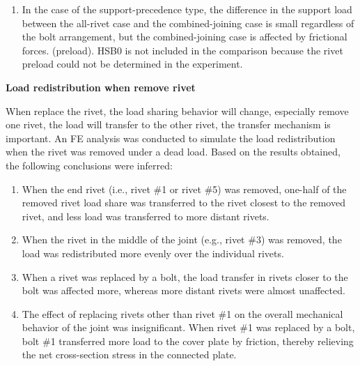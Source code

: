 \begin{enumerate}
    \item In the case of the support-precedence type, the difference in the support load between the all-rivet case and the combined-joining case is small regardless of the bolt arrangement, but the combined-joining case is affected by frictional forces. (preload). HSB0 is not included in the comparison because the rivet preload could not be determined in the experiment.

\end{enumerate}

\textbf{Load redistribution when remove rivet}
 
When replace the rivet, the load sharing behavior will change, especially remove one rivet, the load will transfer to the other rivet, the transfer mechanism is important. An FE analysis was conducted to simulate the load redistribution when the rivet was removed under a dead load. Based on the results obtained, the following conclusions were inferred:

\begin{enumerate}
    \item When the end rivet (i.e., rivet \#1 or rivet \#5) was removed, one-half of the removed rivet load share was transferred to the rivet closest to the removed rivet, and less load was transferred to more distant rivets.

    \item When the rivet in the middle of the joint (e.g., rivet \#3) was removed, the load was redistributed more evenly over the individual rivets.

    \item When a rivet was replaced by a bolt, the load transfer in rivets closer to the bolt was affected more, whereas more distant rivets were almost unaffected.

    \item The effect of replacing rivets other than rivet \#1 on the overall mechanical behavior of the joint was insignificant. When rivet \#1 was replaced by a bolt, bolt \#1 transferred more load to the cover plate by friction, thereby relieving the net cross-section stress in the connected plate.
    
\end{enumerate}




